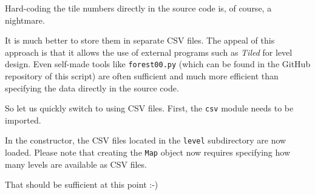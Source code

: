 \begin{warningbox}
	Hard-coding the tile numbers directly in the source code is, of course, a nightmare. 
\end{warningbox}

It is much better to store them in separate CSV files. The appeal of this approach is that it allows the use of external programs such as \emph{Tiled} for level design. Even self-made tools like \texttt{forest00.py} (which can be found in the GitHub repository of this script) are often sufficient and much more efficient than specifying the data directly in the source code.

So let us quickly switch to using CSV files. First, the \texttt{csv} module needs to be imported.


In the constructor, the CSV files located in the \texttt{level} subdirectory are now loaded. Please note that creating the \texttt{Map} object now requires specifying how many levels are available as CSV files.


That should be sufficient at this point :-)










